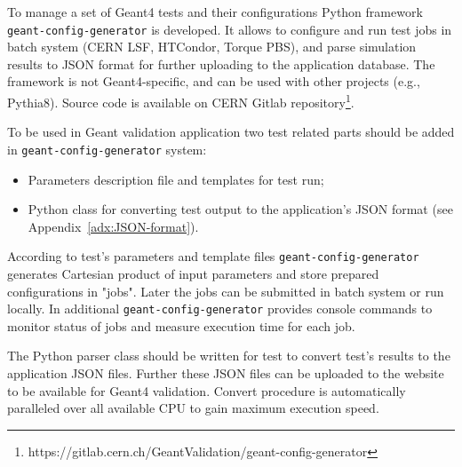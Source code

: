 To manage a set of Geant4 tests and their configurations Python framework {\tt geant-config-generator} is developed. It allows to configure and run test jobs in batch system (CERN LSF, HTCondor, Torque PBS), and parse simulation results to JSON format for further uploading to the application database.
The framework is not Geant4-specific, and can be used with other projects (e.g., Pythia8). Source code is available on
CERN Gitlab repository\footnote{https://gitlab.cern.ch/GeantValidation/geant-config-generator}.

To be used in Geant validation application two test related parts should be added in {\tt geant-config-generator} system:

\begin{itemize}
	\item Parameters description file and templates for test run;
	\item Python class for converting test output to the application's JSON format (see Appendix~\ref{adx:JSON-format}).
\end{itemize}

According to test's parameters and template files {\tt geant-config-generator} generates Cartesian product of input parameters and store prepared configurations in "jobs". Later the jobs can be submitted in batch system or run locally. In additional {\tt geant-config-generator} provides console commands to monitor status of jobs and measure execution time for each job.

The Python parser class should be written for test to convert test's results to the application JSON files. Further these JSON files can be uploaded to the website to be available for Geant4 validation.
Convert procedure is automatically paralleled over all available CPU to gain maximum execution speed.








